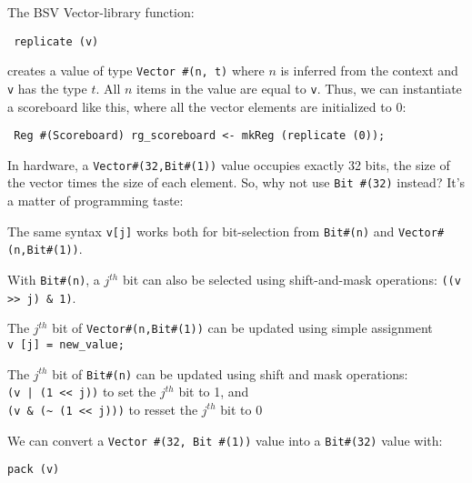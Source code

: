 The BSV Vector-library function:

\begin{tabbing}\footnotesize\tt
\hmm replicate (v)
\end{tabbing}

creates a value of type \verb|Vector #(n, t)| where $n$ is inferred
from the context and \verb|v| has the type $t$.  All $n$ items in the
value are equal to \verb|v|.  Thus, we can instantiate a scoreboard
like this, where all the vector elements are initialized to 0:

\begin{tabbing}\footnotesize\tt
\hmm Reg \#(Scoreboard) rg\_scoreboard <- mkReg (replicate (0));
\end{tabbing}


In hardware, a \verb|Vector#(32,Bit#(1))| value occupies exactly 32
bits, {\ie} the size of the vector times the size of each element.
So, why not use \verb|Bit #(32)| instead?  It's a matter of
programming taste:

\begin{tightlist}

  \item The same syntax \verb|v[j]| works both for bit-selection from
        \verb|Bit#(n)| and \verb|Vector#(n,Bit#(1))|.

  \item With \verb|Bit#(n)|, a $j^{th}$ bit can also be selected using
        shift-and-mask operations: \verb|((v >> j) & 1)|.

  \item The $j^{th}$ bit of \verb|Vector#(n,Bit#(1))| can be updated
        using simple assignment \\
	\hmm \verb|v [j] = new_value;|

  \item The $j^{th}$ bit of \verb|Bit#(n)| can be updated using shift
        and mask operations: \\
	\hmm \verb'(v | (1 << j))' to set the $j^{th}$ bit to 1, and \\
	\hmm \verb|(v & (~ (1 << j)))| to resset the $j^{th}$ bit to 0

\end{tightlist}

We can convert a \verb|Vector #(32, Bit #(1))| value into a \verb|Bit#(32)| value with:

\hmm \verb|pack (v)|

